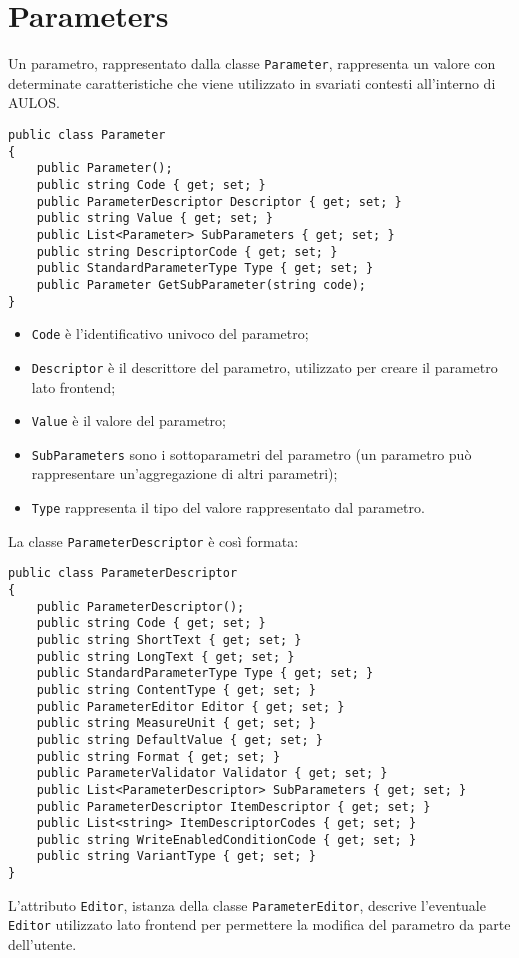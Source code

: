 \section{Parameters}

Un parametro, rappresentato dalla classe \verb|Parameter|, rappresenta un valore con determinate caratteristiche che viene utilizzato in svariati contesti all'interno di AULOS.
\begin{lstlisting}[caption={Parameter.cs},style=sharpCode]
public class Parameter
{
    public Parameter();
    public string Code { get; set; }
    public ParameterDescriptor Descriptor { get; set; }
    public string Value { get; set; }
    public List<Parameter> SubParameters { get; set; }
    public string DescriptorCode { get; set; }
    public StandardParameterType Type { get; set; }
    public Parameter GetSubParameter(string code);
}
\end{lstlisting}
\begin{itemize}
\item \verb|Code| è l'identificativo univoco del parametro;
\item \verb|Descriptor| è il descrittore del parametro, utilizzato per creare il parametro lato frontend;
\item \verb|Value| è il valore del parametro;
\item \verb|SubParameters| sono i sottoparametri del parametro (un parametro può rappresentare un'aggregazione di altri parametri);
\item \verb|Type| rappresenta il tipo del valore rappresentato dal parametro.
\end{itemize}
La classe \verb|ParameterDescriptor| è così formata:
\begin{lstlisting}[caption={ParameterDescriptor.cs},style=sharpCode]
public class ParameterDescriptor
{
    public ParameterDescriptor();        
    public string Code { get; set; }
    public string ShortText { get; set; }
    public string LongText { get; set; }
    public StandardParameterType Type { get; set; }
    public string ContentType { get; set; }
    public ParameterEditor Editor { get; set; }
    public string MeasureUnit { get; set; }
    public string DefaultValue { get; set; }
    public string Format { get; set; }
    public ParameterValidator Validator { get; set; }
    public List<ParameterDescriptor> SubParameters { get; set; }
    public ParameterDescriptor ItemDescriptor { get; set; }
    public List<string> ItemDescriptorCodes { get; set; }
    public string WriteEnabledConditionCode { get; set; }
    public string VariantType { get; set; }
}
\end{lstlisting}
L'attributo \verb|Editor|, istanza della classe \verb|ParameterEditor|, descrive l'eventuale \verb|Editor| utilizzato lato frontend per permettere la modifica del parametro da parte dell'utente.


